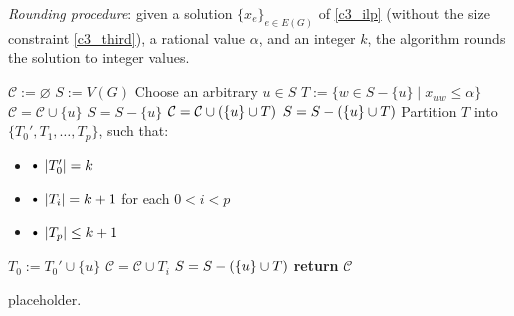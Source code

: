 \begin{algorithm}[H]
    \caption{
        \textit{Rounding procedure}: given a solution $\{x_e\}_{e \in E(G)}$ of \cref{c3_ilp} (without the size constraint \cref{c3_third}), a rational value $\alpha$, and an integer $k$, the algorithm rounds the solution to integer values.
    }

        \label{rounding_procedure}
    \begin{algorithmic}[1]
            \State $\mathcal C := \varnothing$ 
            \State $S := V(G)$
                \State Choose an arbitrary $u \in S$ 
                \State $T := \{w \in S - \{u\} \mid x_{uw} \le \alpha\}$ 
                    \State $\mathcal C = \mathcal C \cup \{u\}$ 
                    \State $S = S - \{u\}$
                    \State $\mathcal C = \mathcal C \cup \left(\{u\} \cup T\right)$ 
                    \State $S = S - \left(\{u\} \cup T\right)$
                \Else
            \State Partition $T$ into $\{T_0', T_1, \ldots, T_p\}$, such that: \begin{itemize} \item[] \quad \quad \quad \quad $\sbullet \ \abs{T_0'} = k$ \item[] \quad \quad \quad \quad $\sbullet \ \abs{T_i} = k + 1$ for each $0 < i < p$ \item[] \quad \quad \quad \quad $\sbullet \ \abs{T_p} \le k + 1$ \end{itemize}
                    \State $T_0 := T_0' \cup \{u\}$ 
                        \State $\mathcal C = \mathcal C \cup T_i$ 
                    \EndFor
                    \State $S = S - \left(\{u\} \cup T\right)$
                \EndIf
            \EndWhile
            \State \textbf{return} $\mathcal C$
        \EndFunction
    \end{algorithmic}
\end{algorithm}

placeholder. 

